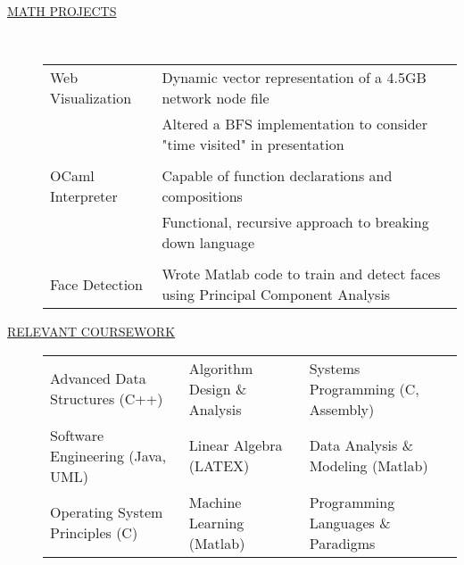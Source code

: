 \documentclass[11pt]{article}
\begin{document}
\begin{description}
	\iffalse
        \item[\underline{MATH PROJECTS}] \hfill \\
            \begin{tabular}{l|l}
                Web Visualization& Dynamic vector representation of a 4.5GB network node file\\
                                 & Altered a BFS implementation to consider "time visited" in presentation\\
					\\
                OCaml Interpreter& Capable of function declarations and compositions \\
                                 & Functional, recursive approach to breaking down language \\
					\\
                Face Detection   & Wrote Matlab code to train and detect faces using Principal Component Analysis\\

            \end{tabular}

        \item[\underline{RELEVANT COURSEWORK}]\hfill

            \begin{tabular}{l|l|l}
                Advanced Data Structures (C++)& Algorithm Design \& Analysis & Systems Programming (C, Assembly)\\
             Software Engineering (Java, UML) & Linear Algebra (LATEX) &  Data Analysis \& Modeling (Matlab) \\
                  Operating System Principles (C) & Machine Learning (Matlab) & Programming Languages \& Paradigms\\
            \end{tabular}


\end{description}
\end{document}
